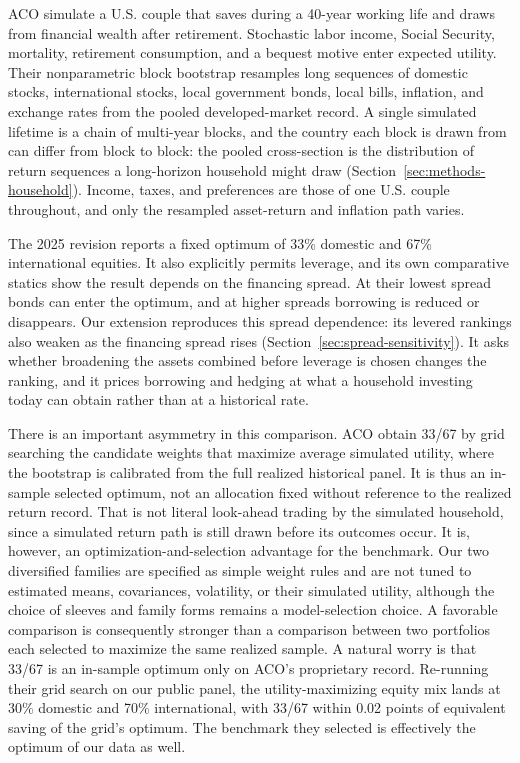 \documentclass[11pt]{article}
\begin{document}
ACO simulate a U.S. couple that saves during a 40-year working life and draws
from financial wealth after retirement. Stochastic labor income, Social
Security, mortality, retirement consumption, and a bequest motive enter
expected utility. Their nonparametric block bootstrap resamples long sequences
of domestic stocks, international stocks, local government bonds, local bills,
inflation, and exchange rates from the pooled developed-market record. A single
simulated lifetime is a chain of multi-year blocks, and the country each block
is drawn from can differ from block to block: the pooled cross-section is the
distribution of return sequences a long-horizon household might draw
(Section~\ref{sec:methods-household}). Income, taxes, and preferences are
those of one U.S. couple throughout, and only the resampled asset-return and
inflation path varies.

The 2025 revision reports a fixed optimum of 33\% domestic and 67\%
international equities. It also explicitly permits leverage, and its own
comparative statics show the result depends on the financing spread. At their
lowest spread bonds can enter the optimum, and at higher spreads borrowing is
reduced or disappears. Our extension reproduces this spread dependence: its
levered rankings also weaken as the financing spread rises
(Section~\ref{sec:spread-sensitivity}). It asks whether broadening the assets
combined before leverage is chosen changes the ranking, and it prices borrowing
and hedging at what a household investing today can obtain rather than at a
historical rate.

There is an important asymmetry in this comparison. ACO obtain 33/67 by grid
searching the candidate weights that maximize average simulated utility, where
the bootstrap is calibrated from the full realized historical panel. It is thus
an in-sample selected optimum, not an allocation fixed without reference to the
realized return record. That is not literal look-ahead trading by the simulated
household, since a simulated return path is still drawn before its outcomes
occur. It is, however, an optimization-and-selection advantage for the
benchmark. Our
two diversified families are specified as simple weight rules and are not tuned
to estimated means, covariances, volatility, or their simulated utility,
although the choice of sleeves and family forms remains a model-selection
choice. A favorable comparison is consequently stronger than a comparison
between two portfolios each selected to maximize the same realized sample.
A natural worry is that 33/67 is an in-sample optimum only on ACO's
proprietary record. Re-running their grid search on our public panel, the
utility-maximizing equity mix lands at 30\% domestic and 70\% international,
with 33/67 within 0.02 points of equivalent saving of the grid's optimum.
The benchmark they selected is effectively the optimum of our data as well.
\end{document}
